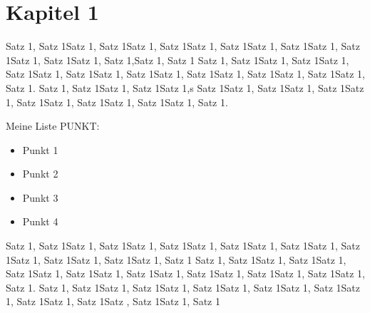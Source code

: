 \section{Kapitel 1}

Satz 1, Satz 1Satz 1, Satz 1Satz 1, \cite{book1} Satz 1Satz 1, Satz 1Satz 1, Satz 1Satz 1, Satz 1Satz 1, Satz 1Satz 1, Satz 1,Satz 1, Satz 1
Satz 1, Satz 1Satz 1, Satz 1Satz 1, Satz 1Satz 1, Satz 1Satz 1, Satz 1Satz 1, Satz 1Satz 1, Satz 1Satz 1, Satz 1Satz 1, Satz 1.
Satz 1, Satz 1Satz 1, Satz 1Satz 1,s Satz 1Satz 1, Satz 1Satz 1, Satz 1Satz 1\cite{book2}, Satz 1Satz 1, Satz 1Satz 1, Satz 1Satz 1, Satz 1.

Meine Liste PUNKT:
\begin{itemize}
    \item Punkt 1
    \item Punkt 2
    \item Punkt 3
    \item Punkt 4
\end{itemize}

Satz 1, Satz 1Satz 1, Satz 1Satz 1\cite{book3}, Satz 1Satz 1, Satz 1Satz 1, Satz 1Satz 1, Satz 1Satz 1, Satz 1Satz 1, Satz 1Satz 1, Satz 1
Satz 1, Satz 1Satz 1, Satz 1Satz 1, Satz 1Satz 1, Satz 1Satz 1, Satz 1Satz 1, Satz 1Satz 1, Satz 1Satz 1, Satz 1Satz 1, Satz 1.
Satz 1, Satz 1Satz 1, Satz 1Satz 1, Satz 1Satz 1, Satz 1Satz 1, Satz 1Satz 1, Satz 1Satz 1, Satz 1Satz \cite{book2}, Satz 1Satz 1, Satz 1